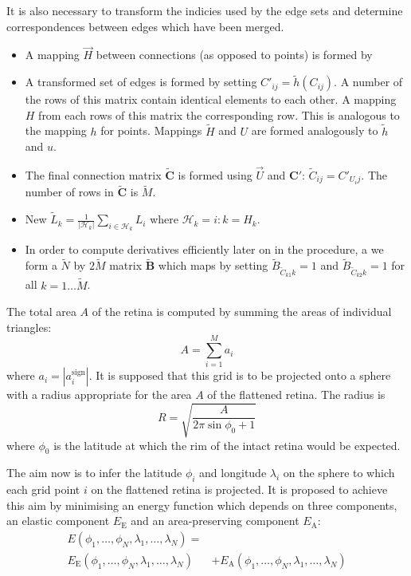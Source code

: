 \documentclass{article}
\begin{document}
It is also necessary to transform the indicies used by the edge sets
and determine correspondences between edges which have been merged. 
\begin{itemize}
\item A mapping $\vec{H}$ between connections (as opposed to points)
  is formed by 
\item A transformed set of edges is formed by setting $C'_{ij} =
  \tilde h(C_{ij})$. A number of the rows of this matrix contain
  identical elements to each other. A mapping $H$ from each rows of
  this matrix the corresponding row. This is analogous to the mapping
  $h$ for points. Mappings $\tilde{H}$ and $U$ are formed
  analogously to $\tilde{h}$ and $u$.
\item The final connection matrix $\tilde{\mathbf{C}}$ is formed using
  $\vec{U}$ and $\mathbf{C}'$: $\tilde C_{ij} = C'_{U_ij}$. The number
  of rows in $\tilde{\mathbf{C}}$ is $\tilde M$.
\item New $\tilde L_k = \frac{1}{|\mathcal{H}_k|}
  \sum_{i\in\mathcal{H}_k} L_i$ where $\mathcal{H}_k = i: k=H_k$. 
\item In order to compute derivatives efficiently later on in the
  procedure, a we form a $\tilde N$ by $2\tilde M$ matrix
  $\tilde{\mathbf{B}}$ which maps by setting $\tilde B_{\tilde
    C_{k1}k} = 1$ and $\tilde B_{\tilde C_{k2}k} = 1$ for all
  $k=1\dots \tilde M$.
\end{itemize}

The total area $A$ of the retina is computed by summing the areas of
individual triangles:
\begin{displaymath}
  A = \sum_{i=1}^M a_i
\end{displaymath}
where $a_i = | a_i^\mathrm{sign}|$.  It is supposed that this grid is
to be projected onto a sphere with a radius appropriate for the area
$A$ of the flattened retina. The radius is
\begin{equation}
  \label{fold-sphere:eq:1}
  R = \sqrt{\frac{A}{2\pi\sin\phi_0+1}}
\end{equation}
where $\phi_0$ is the latitude at which the rim of the intact retina
would be expected.

The aim now is to infer the latitude $\phi_i$ and longitude
$\lambda_i$ on the sphere to which each grid point $i$ on the
flattened retina is projected.  It is proposed to achieve this aim by
minimising an energy function which depends on three components, an
elastic component $E_\mathrm{E}$ and an area-preserving component
$E_\mathrm{A}$:
\begin{equation}
  \begin{split}
  E(\phi_1,\dots,\phi_N,\lambda_1,\dots,\lambda_N) = & \\
  E_\mathrm{E}(\phi_1,\dots,\phi_N,\lambda_1,\dots,\lambda_N) 
  & + E_\mathrm{A}(\phi_1,\dots,\phi_N,\lambda_1,\dots,\lambda_N) 
  \end{split}
\end{equation}
\end{document}
